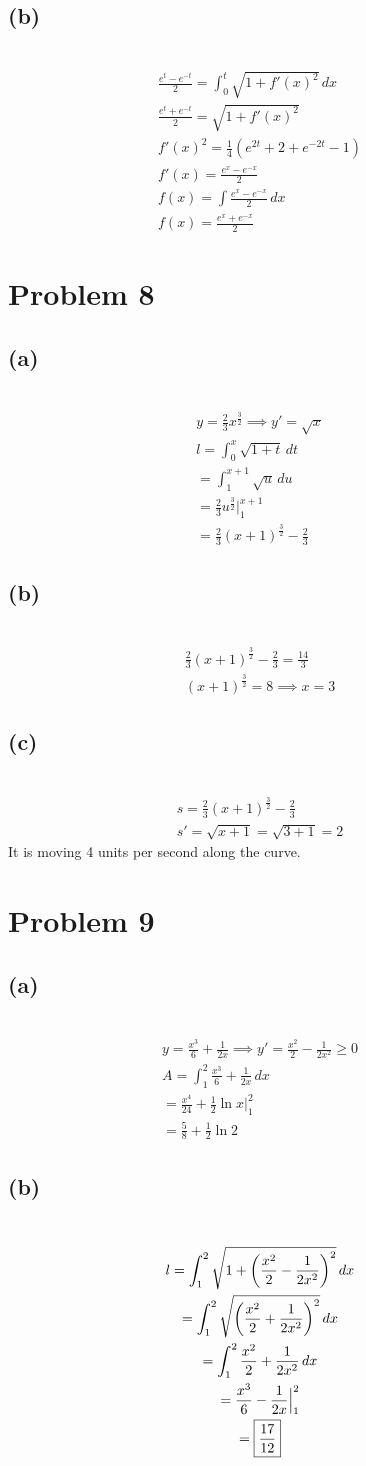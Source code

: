 \documentclass[12pt]{article}
\newcommand*{\paren}[1]{\ensuremath\left(#1\right)}
\newcommand{\at}{\Big|}
\newcommand{\problem}[1]{\section{Problem #1}}
\newcommand{\subproblem}[1]{\subsection{(#1)} \,}
\begin{document}
\subproblem{b}
\begin{gather*}
    \frac{e^t-e^{-t}}{2}=\int_0^t \sqrt{1+f'(x)^2} \, dx\\
    \frac{e^t+e^{-t}}{2}=\sqrt{1+f'(x)^2}\\
    f'(x)^2= \frac{1}{4}(e^{2t}+2+e^{-2t}-1)\\
    f'(x)=\frac{e^x-e^{-x}}{2}\\
    f(x)= \int \frac{e^x-e^{-x}}{2} \, dx\\
    \boxed{f(x)= \frac{e^x+e^{-x}}{2}}
\end{gather*}

\problem{8}

\subproblem{a}
\begin{gather*}
    y=\frac{2}{3}x^\frac{3}{2} \implies y'=\sqrt{x}\\
    l=\int_0^x \sqrt{1+t} \, dt\\
    =\int_{{1}}^{x+1} \sqrt{u} \, du\\
    = \frac{2}{3}u^\frac{3}{2}\at_1^{x+1}\\
    =\boxed{\frac{2}{3}(x+1)^\frac{3}{2}-\frac{2}{3}}
\end{gather*}

\subproblem{b}
\begin{gather*}
    \frac{2}{3}(x+1)^\frac{3}{2}-\frac{2}{3} = \frac{14}{3}\\
    (x+1)^\frac{3}{2}=8 \implies \boxed{x=3}
\end{gather*}

\subproblem{c}
\begin{gather*}
    s=\frac{2}{3}(x+1)^\frac{3}{2}-\frac{2}{3}\\
    s'= \sqrt{x+1} =\sqrt{3+1}=\boxed{2}
\end{gather*}
It is moving 4 units per second along the curve. 

\problem{9}

\subproblem{a}
\begin{gather*}
    y= \frac{x^3}{6} + \frac{1}{2x} \implies y' = \frac{x^2}{2} - \frac{1}{2x^2} \ge 0\\
    A=\int_1^2 \frac{x^3}{6}+\frac{1}{2x}\, dx\\
    = \frac{x^4}{24}+ \frac{1}{2}\ln x \at_1^2\\
    = \boxed{\frac{5}{8}+\frac{1}{2}\ln 2}
\end{gather*}

\subproblem{b}
\begin{gather*}
    l=\int_1^2 \sqrt{1+ \paren{\frac{x^2}{2} - \frac{1}{2x^2}}^2} \, dx\\
    = \int_1^2 \sqrt{\paren{\frac{x^2}{2} + \frac{1}{2x^2}}^2}\, dx\\
    = \int_1^2 \frac{x^2}{2} + \frac{1}{2x^2}\, dx\\
    = \frac{x^3}{6} - \frac{1}{2x} \at_1^2\\
    = \boxed{\frac{17}{12}}
\end{gather*}
\end{document}
